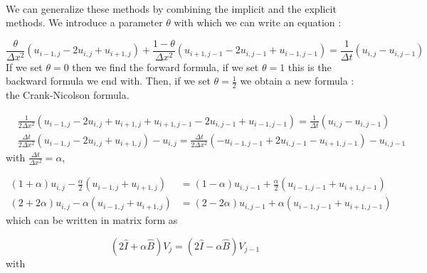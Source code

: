 \documentclass[a4paper, twoside, 11pt]{report}
\theoremstyle{theorem}
\theoremstyle{remark}
\theoremstyle{exemple}
\begin{document}
                \paragraph{}We can generalize these methods by combining the implicit and the explicit methods. We introduce a parameter $\theta$ with which we can write an equation :

                    \begin{equation*}
                        \frac{\theta}{\Delta x^2}(u_{i-1,j}-2u_{i,j}+u_{i+1,j})+\frac{1-\theta}{\Delta x^2}(u_{i+1,j-1}-2u_{i,j-1}+u_{i-1,j-1}) = \frac{1}{\Delta t}(u_{i,j}-u_{i,j-1})
                        \tag{5}
                    \end{equation*}
                    If we set $\theta = 0$ then we find the forward formula, if we set $\theta=1$ this is the backward formula we end with. Then, if we set $\displaystyle \theta=\frac{1}{2}$ we obtain a new formula : the Crank-Nicolson formula.

                    \begin{align*}
                        &\frac{1}{2\Delta x^2}(u_{i-1,j}-2u_{i,j}+u_{i+1,j}+u_{i+1,j-1}-2u_{i,j-1}+u_{i-1,j-1}) = \frac{1}{\Delta t}(u_{i,j}-u_{i,j-1})\\
                        &\frac{\Delta t}{2\Delta x^2}(u_{i-1,j} - 2u_{i,j} + u_{i+1,j})-u_{i,j} = \frac{\Delta t}{2\Delta x^2}(-u_{i-1,j-1}+2u_{i,j-1}-u_{i+1,j-1})-u_{i,j-1}
                    \end{align*}
                    with $\frac{\Delta t }{\Delta x^2}=\alpha$,

                    \begin{align*}
                        (1+\alpha)u_{i,j}-\frac{\alpha}{2}(u_{i-1,j}+u_{i+1,j}) &= (1-\alpha)u_{i,j-1}+\frac{\alpha}{2}(u_{i-1,j-1}+u_{i+1,j-1})\\
                        (2+2\alpha)u_{i,j}-\alpha(u_{i-1,j}+u_{i+1,j}) &= (2-2\alpha)u_{i,j-1}+\alpha(u_{i-1,j-1}+u_{i+1,j-1})
                    \end{align*}
                    which can be written in matrix form as

                    \begin{equation*}
                        (2\hat{I}+\alpha\hat{B})V_j=(2\hat{I}-\alpha \hat{B})V_{j-1}
                    \end{equation*}
                    with
\end{document}
